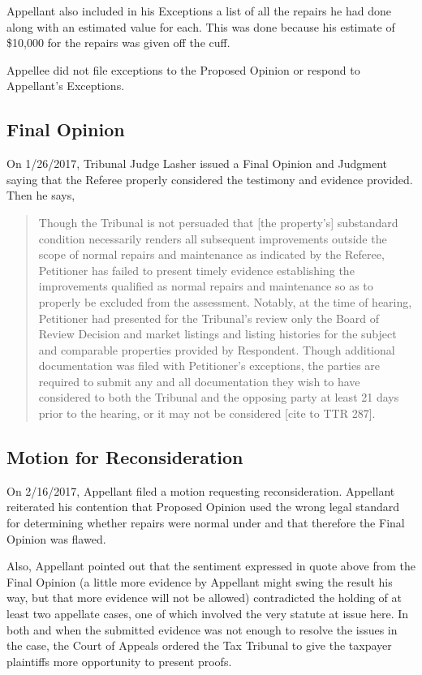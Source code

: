 \documentclass[12pt,\documentclassflag]{michiganCourtOfAppealsBrief}
\begin{document}
Appellant also included in his Exceptions a list of all the repairs he had done along with an estimated value for each. This was done because his estimate of \$10,000 for the repairs was given off the cuff.

Appellee did not file exceptions to the Proposed Opinion or respond to Appellant's Exceptions.

\subsection{Final Opinion}
On 1/26/2017, Tribunal Judge Lasher issued a Final Opinion and Judgment saying that the Referee properly considered the testimony and evidence provided. Then he says,

\begin{quote}%
Though the Tribunal is not persuaded that [the property's] substandard condition necessarily renders all subsequent improvements outside the scope of normal repairs and maintenance as indicated by the Referee, Petitioner has failed to present timely evidence establishing the improvements qualified as normal repairs and maintenance so as to properly be excluded from the assessment. Notably, at the time of hearing, Petitioner had presented for the Tribunal's review only the Board of Review Decision and market listings and listing histories for the subject and comparable properties provided by Respondent. Though additional documentation was filed with Petitioner's exceptions, the parties are required to submit any and all documentation they wish to have considered to both the Tribunal and the opposing party at least 21 days prior to the hearing, or it may not be considered [cite to TTR 287].
\end{quote}

\subsection{Motion for Reconsideration}
On 2/16/2017, Appellant filed a motion requesting reconsideration. Appellant reiterated his contention that Proposed Opinion used the wrong legal standard for determining whether repairs were normal under  and that therefore the Final Opinion was flawed. 

Also, Appellant pointed out that the sentiment expressed in quote above from the Final Opinion (a little more evidence by Appellant might swing the result his way, but that more evidence will not be allowed) contradicted the holding of at least two appellate cases, one of which involved the very statute at issue here. In both \cite{Jones & Laughlin} and \cite{Fisher} when the submitted evidence was not enough to resolve the issues in the case, the Court of Appeals ordered the Tax Tribunal to give the taxpayer plaintiffs more opportunity to present proofs. 
\end{document}
